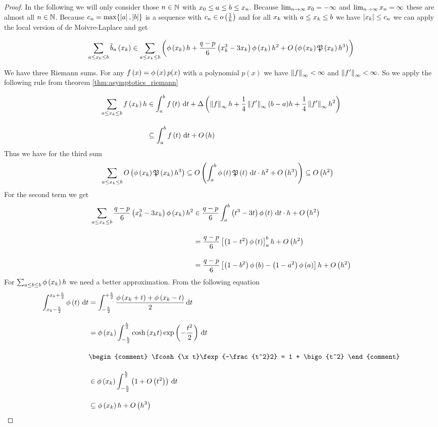 \begin{proof}
  In the following we will only consider those $n\in\N$ with $\x[0] \le a \le b \le \x[n]$. Because $\lim_{n\to\infty} \x[0] = -\infty$ and $\lim_{n\to\infty} \x[n] = \infty$ these are almost all $n\in\N$. Because $c_n=\max\{\abs{a},\abs{b}\}$ is a sequence with $c_n\in\littleo{\frac 1h}$ and for all $\x$ with $a \le \x \le b$ we have $\abs{\x} \le c_n$ we can apply the local version of de Moivre-Laplace and get

  \begin{align}
    \sum_{a \le \x \le b} \bb{\x} \in \sum_{a \le \x \le b} \br{\fphi{\x} h +\frac{q-p}6 \left(\x^3 - 3\x\right) \fphi{\x} h^2 + \bigo{\fphi{\x}\pol{\x}h^3}}
  \end{align}

  We have three Riemann sums. For any $\f{x}=\fphi{x}p(x)$ with a polynomial $p(x)$ we have $\snorm{f} < \infty$ and $\snorm{f'}<\infty$. So we apply the following rule from theorem \ref{thm:asymptotics_riemann}

  \begin{align}
    \sum_{a \le \x \le b} \f{\x} h & \in \int_a^b \f{t} \d{t} + \bigabs{\snorm{f}h + \frac 14 \snorm{f'} (b-a) h + \frac 14 \snorm{f'} h^2} \bnl
    & \subseteq  \int_a^b \f{t} \d{t} + \bigo{h}
  \end{align}
  Thus we have for the third sum
  \begin{align}
    \sum_{a \le \x \le b} \bigo{\fphi{\x} \pol{\x} h^3} & \subseteq \bigo{\int_a^b \fphi{t} \pol{t} \d{t} \cdot h^2 + \bigo{h^3}} \subseteq \bigo{h^2}
  \end{align}
  For the second term we get
  \begin{align}
    \sum_{a \le \x \le b} \frac{q-p}6 \br{\x^3 - 3\x} \fphi{\x} h^2 &\in \frac{q-p}6 \int_a^b \br{t^3-3t}\fphi{t} \d{t} \cdot h + \bigo{h^2} \bnl
    &= \frac{q-p}6 \left[ \br{1-t^2}\fphi{t} \right]_a^b h + \bigo{h^2} \bnl
    &= \frac{q-p}6 \left[ \br{1-b^2}\fphi{b} - \br{1-a^2}\fphi{a} \right] h + \bigo{h^2}
  \end{align}
  For $\sum_{a\le b\le b} \fphi{\x}h$ we need a better approximation. From the following equation
  \begin{align}
    \int_{\x-\frac h2}^{\x+\frac h2} \fphi{t} \d{t} & = \int_{-\frac h2}^{+\frac h2} \frac{\fphi{\x+t}+\fphi{\x-t}}2 \d{t} \bnl
    & = \fphi{\x} \int_{-\frac h2}^{\frac h2} \fcosh{\x t} \fexp{-\frac{t^2}2} \d{t} \bnl
    &
    \begin{comment}
      \fcosh{\x t}\fexp{-\frac{t^2}2} = 1 + \bigo{t^2}
    \end{comment} \bnl
    & \in \fphi{\x} \int_{-\frac h2}^{\frac h2} \br{1+\bigo{t^2}} \d{t} \bnl
    & \subseteq \fphi{\x} h + \bigo{h^3}
  \end{align}


\end{proof}
